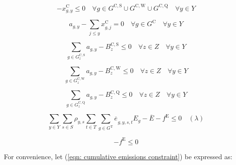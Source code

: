 \documentclass{article}
\newcommand{\sGeneratorsCandidate}{G^{\mathrm{C}}}
\newcommand{\sGeneratorsCandidateWind}{G^{\mathrm{C,W}}}
\newcommand{\sGeneratorsCandidateSolar}{G^{\mathrm{C,S}}}
\newcommand{\sGeneratorsThermal}{G^{\mathrm{T}}}
\newcommand{\sStorageCandidate}{G^{\mathrm{C,Q}}}
\newcommand{\sYears}{Y}
\newcommand{\sScenarios}{S}
\newcommand{\sIntervals}{T}
\newcommand{\sZones}{Z}
\newcommand{\iGenerator}{g}
\newcommand{\iYear}{y}
\newcommand{\iYearAlias}{j}
\newcommand{\iScenario}{s}
\newcommand{\iInterval}{t}
\newcommand{\iZone}{z}
\newcommand{\cScenarioDuration}[1][\iYear,\iScenario]{\rho_{#1}}
\newcommand{\cEmissionsIntensity}[1][\iGenerator]{E_{#1}}
\newcommand{\cBuildLimitWind}{B^{\mathrm{C,\mathrm{W}}}_{\iZone}}
\newcommand{\cBuildLimitSolar}{B^{\mathrm{C,\mathrm{S}}}_{\iZone}}
\newcommand{\cBuildLimitStorage}{B^{\mathrm{C,\mathrm{Q}}}_{\iZone}}
\newcommand{\cEmmissionsCumulativeTarget}{\overline{E}}
\newcommand{\vEnergy}[1][\iGenerator,\iYear,\iScenario,\iInterval]{e_{#1}}
\newcommand{\vInstalledCapacity}[1][\iGenerator,\iYear]{x^{\mathrm{C}}_{#1}}
\newcommand{\vEmissionsTargetViolation}{f^{\mathrm{E}}}
\newcommand{\vInstalledCapacityTotal}[1][\iGenerator,\iYear]{a_{#1}}
\begin{document}
\begin{equation}
- \vInstalledCapacity[\iGenerator,\iYear] \leq 0 \quad \forall \iGenerator \in \sGeneratorsCandidateSolar \cup \sGeneratorsCandidateWind \cup \sStorageCandidate \quad \forall \iYear \in \sYears
\end{equation}

\begin{equation}
\vInstalledCapacityTotal - \sum\limits_{\iYearAlias \leq \iYear} \vInstalledCapacity[\iGenerator,\iYearAlias] = 0 \quad \forall \iGenerator \in \sGeneratorsCandidate \quad \forall \iYear \in \sYears
\end{equation}

\begin{equation}
\sum\limits_{\iGenerator \in \sGeneratorsCandidateSolar_{\iZone}} \vInstalledCapacityTotal - \cBuildLimitSolar \leq 0 \quad \forall \iZone \in \sZones \quad \forall \iYear \in \sYears
\end{equation}

\begin{equation}
\sum\limits_{\iGenerator \in \sGeneratorsCandidateWind_{\iZone}} \vInstalledCapacityTotal - \cBuildLimitWind \leq 0 \quad \forall \iZone \in \sZones \quad \forall \iYear \in \sYears 
\end{equation}

\begin{equation}
\sum\limits_{\iGenerator \in \sStorageCandidate_{\iZone}} \vInstalledCapacityTotal - \cBuildLimitStorage \leq 0  \quad \forall \iZone \in \sZones \quad \forall \iYear \in \sYears
\label{eqn: storage build limit constraint}
\end{equation}

\begin{equation}
\sum\limits_{\iYear \in \sYears} \sum\limits_{\iScenario \in \sScenarios} \cScenarioDuration \sum\limits_{\iInterval \in \sIntervals} \sum\limits_{\iGenerator \in \sGeneratorsThermal} \overline{\vEnergy[]}_{\iGenerator,\iYear,\iScenario,\iInterval} \cEmissionsIntensity - \cEmmissionsCumulativeTarget - \vEmissionsTargetViolation \leq 0 \quad (\lambda)
	\label{eqn: cumulative emissions constraint}
\end{equation}

\begin{equation}
	- \vEmissionsTargetViolation \leq 0
	\label{eqn: non-negative emissions constraint violation}
\end{equation}

For convenience, let (\ref{eqn: cumulative emissions constraint}) be expressed as:
\end{document}
